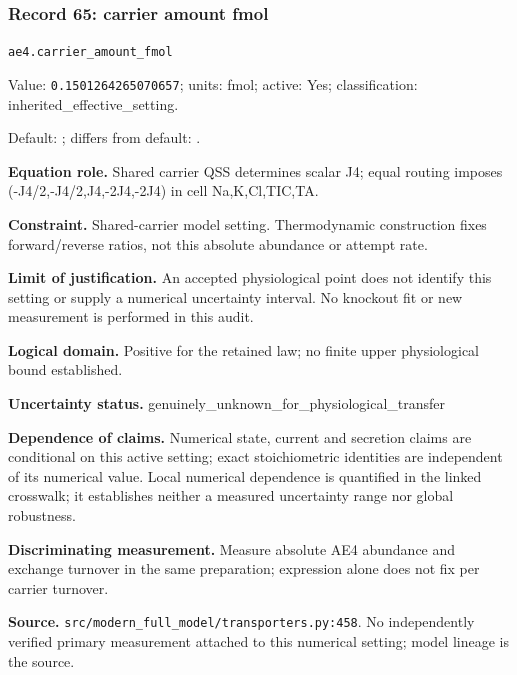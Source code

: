 \subsubsection*{Record 65: carrier amount fmol}
{\small \nolinkurl{ae4.carrier_amount_fmol}\par

Value: \texttt{0.1501264265070657}; units: fmol; active: Yes; classification: inherited\_effective\_setting.\par

Default: ; differs from default: .\par

\textbf{Equation role.} Shared carrier QSS determines scalar J4; equal routing imposes (-J4/2,-J4/2,J4,-2J4,-2J4) in cell Na,K,Cl,TIC,TA.\par

\textbf{Constraint.} Shared-carrier model setting. Thermodynamic construction fixes forward/reverse ratios, not this absolute abundance or attempt rate.\par

\textbf{Limit of justification.} An accepted physiological point does not identify this setting or supply a numerical uncertainty interval. No knockout fit or new measurement is performed in this audit.\par

\textbf{Logical domain.} Positive for the retained law; no finite upper physiological bound established.\par

\textbf{Uncertainty status.} genuinely\_unknown\_for\_physiological\_transfer\par

\textbf{Dependence of claims.} Numerical state, current and secretion claims are conditional on this active setting; exact stoichiometric identities are independent of its numerical value. Local numerical dependence is quantified in the linked crosswalk; it establishes neither a measured uncertainty range nor global robustness.\par

\textbf{Discriminating measurement.} Measure absolute AE4 abundance and exchange turnover in the same preparation; expression alone does not fix per carrier turnover.\par

\textbf{Source.} \nolinkurl{src/modern_full_model/transporters.py:458}. No independently verified primary measurement attached to this numerical setting; model lineage is the source.\par}

